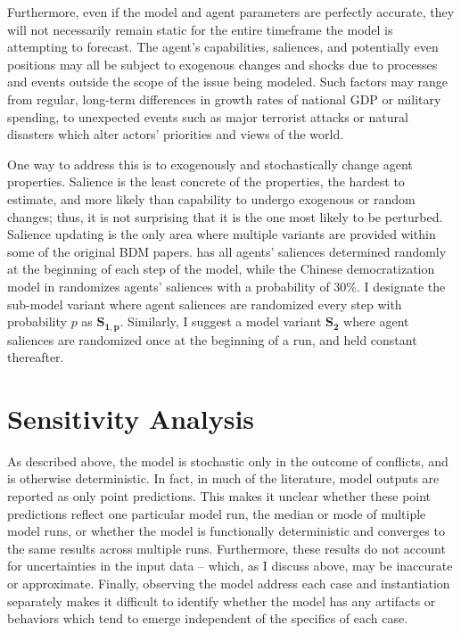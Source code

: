 Furthermore, even if the model and agent parameters are perfectly accurate, they will not necessarily remain static for the entire timeframe the model is attempting to forecast. The agent's capabilities, saliences, and potentially even positions may all be subject to exogenous changes and shocks due to processes and events outside the scope of the issue being modeled. Such factors may range from regular, long-term differences in growth rates of national GDP or military spending, to unexpected events such as major terrorist attacks or natural disasters which alter actors' priorities and views of the world.

One way to address this is to exogenously and stochastically change agent properties. Salience is the least concrete of the properties, the hardest to estimate, and more likely than capability to undergo exogenous or random changes; thus, it is not surprising that it is the one most likely to be perturbed. Salience updating is the only area where multiple variants are provided within some of the original BDM papers. \citet{bdm_1998} has all agents' saliences determined randomly at the beginning of each step of the model, while the Chinese democratization model in \citet[chapter 6]{bdm_2002} randomizes agents' saliences with a probability of 30\%. I designate the sub-model variant where agent saliences are randomized every step with probability $p$ as $\mathbf{S_{1,p}}$. Similarly, I suggest a model variant $\mathbf{S_2}$ where agent saliences are randomized once at the beginning of a run, and held constant thereafter.

\section{Sensitivity Analysis} \label{sensitivity-analysis}

As described above, the model is stochastic only in the outcome of conflicts, and is otherwise deterministic. In fact, in much of the literature, model outputs are reported as only point predictions. This makes it unclear whether these point predictions reflect one particular model run, the median or mode of multiple model runs, or whether the model is functionally deterministic and converges to the same results across multiple runs. Furthermore, these results do not account for uncertainties in the input data -- which, as I discuss above, may be inaccurate or approximate. Finally, observing the model address each case and instantiation separately makes it difficult to identify whether the model has any artifacts or behaviors which tend to emerge independent of the specifics of each case.

